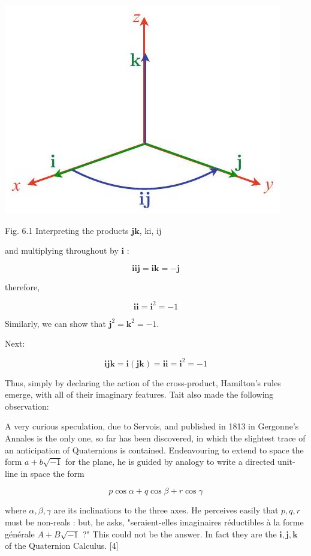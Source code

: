 \documentclass[10pt]{article}
\begin{document}
\begin{center}
\includegraphics[max width=\textwidth]{2023_04_20_41f1ceac5a31dc7d1b59g-089(3)}
\end{center}

Fig. 6.1 Interpreting the products $\mathbf{j k}$, ki, ij

and multiplying throughout by $\mathbf{i}$ :

$$
\mathbf{i i j}=\mathbf{i k}=-\mathbf{j}
$$

therefore,

$$
\mathbf{i i}=\mathbf{i}^{2}=-1
$$

Similarly, we can show that $\mathbf{j}^{2}=\mathbf{k}^{2}=-1$.

Next:

$$
\mathbf{i} \mathbf{j} \mathbf{k}=\mathbf{i}(\mathbf{j} \mathbf{k})=\mathbf{i} \mathbf{i}=\mathbf{i}^{2}=-1
$$

Thus, simply by declaring the action of the cross-product, Hamilton's rules emerge, with all of their imaginary features. Tait also made the following observation:

A very curious speculation, due to Servois, and published in 1813 in Gergonne's Annales is the only one, so far has been discovered, in which the slightest trace of an anticipation of Quaternions is contained. Endeavouring to extend to space the form $a+b \sqrt{-1}$ for the plane, he is guided by analogy to write a directed unit-line in space the form

$$
p \cos \alpha+q \cos \beta+r \cos \gamma
$$

where $\alpha, \beta, \gamma$ are its inclinations to the three axes. He perceives easily that $p, q, r$ must be non-reals : but, he asks, "seraient-elles imaginaires réductibles à la forme générale $A+B \sqrt{-1}$ ?" This could not be the answer. In fact they are the $\mathbf{i}, \mathbf{j}, \mathbf{k}$ of the Quaternion Calculus. [4]
\end{document}
